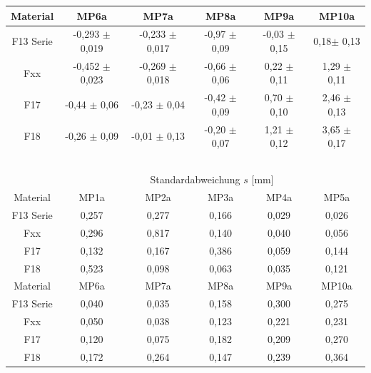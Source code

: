 \documentclass[12pt,a4paper,parskip,twoside,BCOR5mm,headsepline]{scrartcl}
\begin{document}
\begin{description*}
\begin{table}[hbtp]
\begin{tabular}{cccccc}
  Material   & MP6a & MP7a & MP8a & MP9a & MP10a  \\
  \midrule
      F13 Serie &   -0,293 $\pm$ 0,019 &-0,233 $\pm$ 0,017 & -0,97 $\pm$ 0,09 & -0,03 $\pm$ 0,15 & 0,18$\pm$ 0,13 \\
Fxx & -0,452 $\pm$ 0,023 & -0,269 $\pm$ 0,018 & -0,66 $\pm$ 0,06 & 0,22 $\pm$ 0,11 & 1,29 $\pm$ 0,11  \\
  F17  & -0,44 $\pm$ 0,06 & -0,23 $\pm$ 0,04 &-0,42 $\pm$ 0,09&0,70 $\pm$ 0,10 & 2,46 $\pm$ 0,13 \\
  F18 & -0,26 $\pm$ 0,09 & -0,01 $\pm$ 0,13 &-0,20 $\pm$ 0,07 & 1,21 $\pm$ 0,12 & 3,65 $\pm$ 0,17 \\
     
     \bottomrule
      
     &&&&&\\
     &&&&&\\
     &&&&&\\
     &&&&&\\
     &&&&&\\
     
     \toprule
      & \multicolumn{5}{c}{Standardabweichung $s$ [mm]}\\
   \cmidrule(ll){2-6}
   Material    & MP1a & MP2a & MP3a & MP4a & MP5a \\ 
   \midrule
    F13 Serie &0,257&0,277&0,166&0,029&0,026\\
    Fxx &0,296&0,817&0,140&0,040&0,056\\
    F17 &0,132&0,167&0,386&0,059&0,144\\
    F18 &0,523&0,098&0,063&0,035&0,121 \\
    
     \midrule
    
  Material    & MP6a & MP7a & MP8a & MP9a & MP10a  \\
  \midrule
    F13 Serie & 0,040 &0,035&0,158&0,300&0,275\\
 Fxx   &0,050&0,038&0,123&0,221&0,231\\
F17 &0,120&0,075&0,182&0,209&0,270\\ 
F18 &0,172&0,264&0,147&0,239&0,364\\
   \bottomrule 
         
   \end{tabular} 
\end{table}
























\end{description*}
\end{document}
